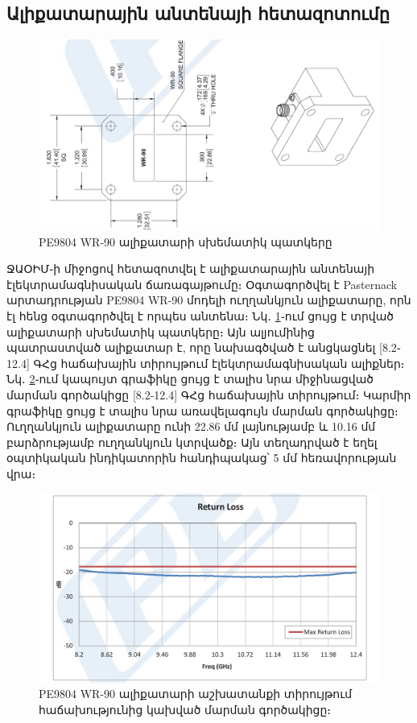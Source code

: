 \documentclass[12pt, fleqn]{report}
\begin{document}
\subsection{Ալիքատարային անտենայի հետազոտումը}
\begin{figure}
    \centering
    \includegraphics[width=1.0\textwidth]{data/waveguide/waveguide-scheme.png}
    \caption{PE9804 WR-90 ալիքատարի սխեմատիկ պատկերը}
    \label{fig:waveguide-scheme}
\end{figure}
ՋԱՕԻՄ֊ի միջոցով հետազոտվել է ալիքատարային անտենայի էլեկտրամագնիսական ճառագայթումը։ Օգտագործվել է Pasternack արտադրության PE9804 WR-90 մոդելի ուղղանկյուն ալիքատարը, որն էլ հենց օգտագործվել է որպես անտենա։ Նկ․ \ref{fig:waveguide-scheme}֊ում ցույց է տրված ալիքատարի սխեմատիկ պատկերը։ Այն ալյումինից պատրաստված ալիքատար է, որը նախագծված է անցկացնել [8.2֊12.4] ԳՀց հաճախային տիրույթում էլեկտրամագնիսական ալիքներ։ Նկ․ \ref{fig:waveguide-return-loss}֊ում կապույտ գրաֆիկը ցույց է տալիս նրա միջինացված մարման գործակիցը [8.2-12.4] ԳՀց հաճախային տիրույթում։ Կարմիր գրաֆիկը ցույց է տալիս նրա առավելագույն մարման գործակիցը։ Ուղղանկյուն ալիքատարը ունի 22.86 մմ լայնությամբ և 10.16 մմ բարձրությամբ ուղղանկյուն կտրվածք։ Այն տեղադրված է եղել օպտիկական ինդիկատորին հանդիպակաց՝ 5 մմ հեռավորության վրա։
\begin{figure}
    \centering
    \includegraphics[width=1.0\textwidth]{data/waveguide/return-loss.png}
    \caption{PE9804 WR-90 ալիքատարի աշխատանքի տիրույթում հաճախությունից կախված մարման գործակիցը։}
    \label{fig:waveguide-return-loss}
\end{figure}
\end{document}
